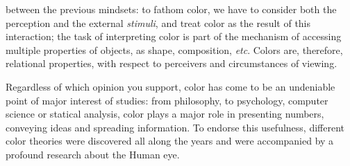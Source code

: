 \documentclass{report}
\begin{document}
between the previous mindsets: to fathom color, we have to consider both the perception and the external
\emph{stimuli}, and treat color as the result of this interaction; the task of interpreting color is part of
the mechanism of accessing multiple properties of objects, as shape, composition, \emph{etc}.
Colors are, therefore, relational properties, with respect to perceivers and circumstances of viewing. \par
Regardless of which opinion you support, color has come to be an undeniable point of major interest of studies:
from philosophy, to psychology, computer science or statical analysis, color plays a major role in presenting
numbers, conveying ideas and spreading information. To endorse this usefulness, different color theories were
discovered all along the years and were accompanied by a profound research about the Human eye.
%
\end{document}
